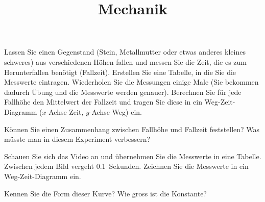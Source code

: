 \documentclass[12pt,a5paper,landscape]{article}
\title{Mechanik}
\date{}
\begin{document}
\begin{aufgabe}
	Lassen Sie einen Gegenstand (Stein, Metallmutter oder etwas anderes kleines schweres) aus verschiedenen
	Höhen fallen und messen Sie die Zeit, die es zum Herunterfallen benötigt (Fallzeit).
	Erstellen Sie eine Tabelle, in die Sie die Messwerte eintragen.
	Wiederholen Sie die Messungen einige Male (Sie bekommen dadurch Übung und die Messwerte werden genauer).
	Berechnen Sie für jede Fallhöhe den Mittelwert der Fallzeit und tragen Sie diese in ein
	Weg-Zeit-Diagramm ($x$-Achse Zeit, $y$-Achse Weg) ein.

	Können Sie einen Zusammenhang zwischen Fallhöhe und Fallzeit feststellen?
	Was müsste man in diesem Experiment verbessern?
\end{aufgabe}

\begin{aufgabe}
	Schauen Sie sich das Video an und übernehmen Sie die Messwerte in eine Tabelle.
	Zwischen jedem Bild vergeht \SI{0.1}{Sekunden}.
	Zeichnen Sie die Messwerte in ein Weg-Zeit-Diagramm ein.

	Kennen Sie die Form dieser Kurve? Wie gross ist die Konstante?
\end{aufgabe}
\end{document}
